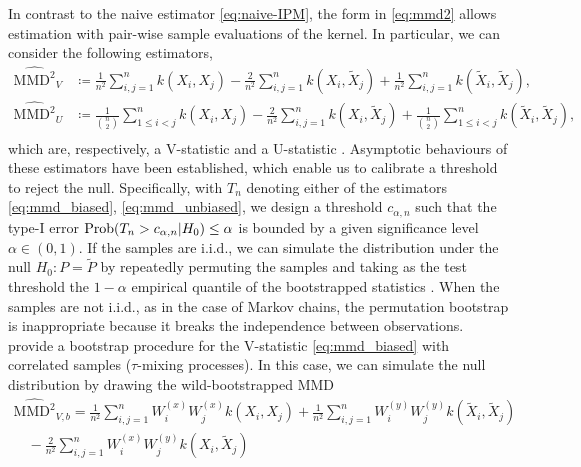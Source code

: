 \documentclass{article}
\begin{document}
In contrast to the naive estimator \eqref{eq:naive-IPM}, the form in \eqref{eq:mmd2} allows estimation with pair-wise sample evaluations of the kernel. 
In particular, we can consider the following estimators, 
\begin{align}
        \widehat{\mathrm{MMD}^2}_{V} &\coloneqq \frac{1}{n^2}  \sum_{i,j=1}^n k\left(X_{i}, X_{j}\right)
        -\frac{2}{n^2} \sum_{i,j=1}^{n} k\left(X_{i}, \tilde{X}_{j}\right)+\frac{1}{n^2}\sum_{i,j=1}^{n} k\left(\tilde{X}_{i}, \tilde{X}_{j}\right), \label{eq:mmd_biased}\\
    \widehat{\mathrm{MMD}^2}_{U} &\coloneqq \frac{1}{{n\choose 2}} \sum_{1\leq i < j}^{n} k\left(X_{i}, X_{j}\right) -\frac{2}{n^2} \sum_{i,j = 1}^{n} k\left(X_{i}, \tilde{X}_{j}\right) + \frac{1}{{n \choose 2}}\sum_{1\leq i < j}^n k\left(\tilde{X}_{i}, \tilde{X}_{j}\right), \label{eq:mmd_unbiased}\\
\end{align}
which are, respectively, a V-statistic and a U-statistic \citep{Hoeffding1948, Vaart_1998, Mises1947asymptotic}.
Asymptotic behaviours of these estimators have been established, which enable us to calibrate a threshold to reject the null. 
Specifically, with $T_n$ denoting either of the estimators \eqref{eq:mmd_biased}, \eqref{eq:mmd_unbiased}, we design a threshold $c_{\alpha, n}$ such that the type-I error $\mathrm{Prob} (T_n > c_{\alpha, n}\vert H_0)\leq \alpha$ is bounded by a given significance level $\alpha \in (0,1)$.
If the samples are i.i.d., we can simulate the distribution under the null $H_0: P=\tilde{P}$ by repeatedly permuting the samples and taking as the test threshold the $1-\alpha$ empirical quantile of the bootstrapped statistics \citep{gretton_kernel_2012}. 
When the samples are not i.i.d., as in the case of Markov chains, the permutation bootstrap is inappropriate because it breaks the independence between observations.
\citet{chwialkowski_wild_2014} provide a bootstrap procedure for the V-statistic \eqref{eq:mmd_biased} with correlated samples ($\tau$-mixing processes).
In this case, we can simulate the null distribution by drawing the wild-bootstrapped MMD
\begin{equation}
\begin{array}{c}
\widehat{\mathrm{MMD}^2}_{V, b}=\frac{1}{n^2} \sum_{i,j=1}^{n} W_{i}^{(x)} W_{j}^{(x)} k\left(X_{i}, X_{j}\right)+\frac{1}{n^2} \sum_{i,j=1}^{n} W_{i}^{(y)} W_{j}^{(y)} k\left(\tilde{X}_{i}, \tilde{X}_{j}\right) \\
\quad-\frac{2}{n^2} \sum_{i,j=1}^{n}W_{i}^{(x)} W_{j}^{(y)} k\left(X_{i}, \tilde{X}_{j}\right)
\end{array}
\label{eq:wb_mmd}
\end{equation}
\end{document}
